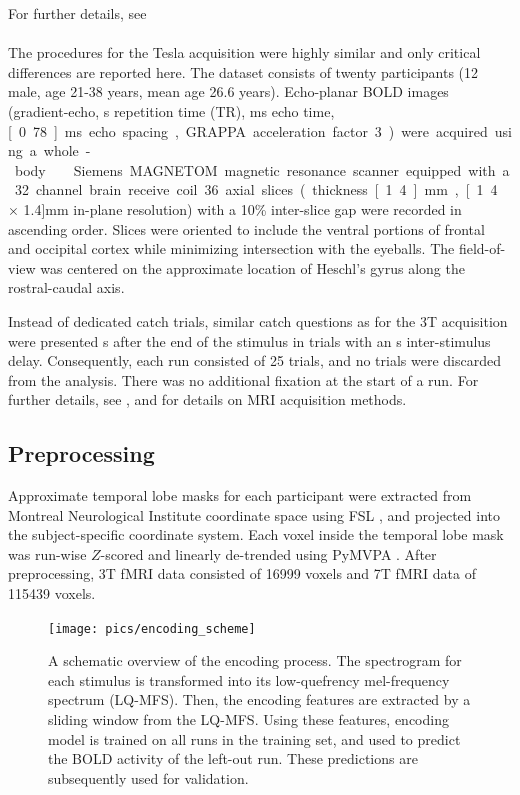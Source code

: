 For further details, see \citet{CTK+2012}

\paragraph{\sevenT}
%
The procedures for the \unit[7]{Tesla} acquisition were highly similar and only critical differences are reported here.
The dataset consists of twenty participants (12 male, age 21-38 years, mean age 26.6 years).
Echo-planar BOLD images (gradient-echo, \unit[2]{s} repetition time (TR), \unit[22]{ms} echo time, \unit[0.78]{ms} echo spacing, GRAPPA acceleration factor 3) were acquired using a whole-body \sevenT\ Siemens MAGNETOM magnetic resonance scanner equipped with a 32 channel brain receive coil. 36 axial slices (thickness \unit[1.4]{mm}, \unit[1.4 $\times$ 1.4]{mm} in-plane resolution) with a 10\% inter-slice gap were recorded in ascending order. Slices were oriented to include the ventral portions of frontal and occipital cortex while minimizing intersection with the eyeballs. The field-of-view was centered on the approximate location of Heschl's gyrus along the rostral-caudal axis.

Instead of dedicated catch trials, similar catch questions as for the 3T acquisition were presented \unit[4]{s} after the end of the stimulus in trials with an \unit[8]{s} inter-stimulus delay. Consequently, each run consisted of 25 trials, and no trials were discarded from the analysis.  There was no additional fixation at the start of a run. For further details, see \citet{HDH+2015}, and \citet{HBI+14} for details on MRI acquisition methods.

\subsection*{Preprocessing}

Approximate temporal lobe masks for each participant were extracted from Montreal Neurological Institute coordinate space using FSL \citep{SJB+04,JBB+12}, and projected into the subject-specific coordinate system.  Each voxel inside the temporal lobe mask was run-wise $Z$-scored and linearly de-trended using PyMVPA \citep{HHS09b}. After preprocessing, 3T f{MRI} data consisted of 16999 voxels and 7T f{MRI} data of 115439 voxels.

\begin{figure}
  \centering
  \texttt{[image: pics/encoding\_scheme]}

  \caption{A schematic overview of the encoding process. The spectrogram for
    each stimulus is transformed into its low-quefrency mel-frequency spectrum
    (LQ-MFS). Then, the encoding features are extracted by a sliding window
    from the LQ-MFS. Using these features, encoding model is trained on all
    runs in the training set, and used to predict the BOLD activity of the
  left-out run.  These predictions are subsequently used for validation.}

 \label{fig:encoding_scheme}
\end{figure}

